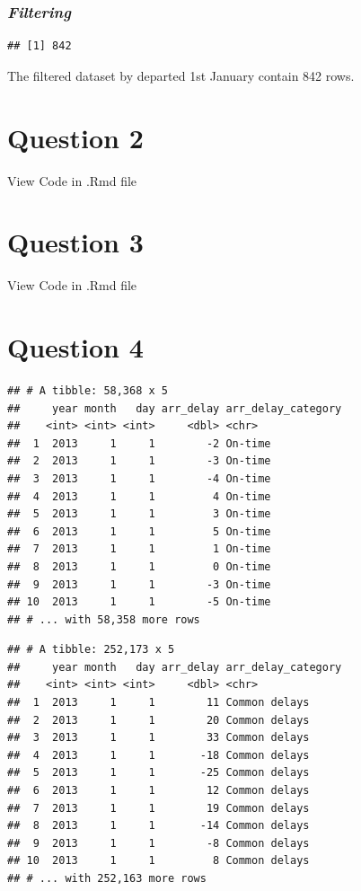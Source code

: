 \documentclass[
]{article}
\begin{document}
\hypertarget{filtering}{%
\subsubsection{\texorpdfstring{\emph{Filtering}}{Filtering}}\label{filtering}}

\begin{verbatim}
## [1] 842
\end{verbatim}

The filtered dataset by departed 1st January contain 842 rows.

\hypertarget{question-2}{%
\section{Question 2}\label{question-2}}

View Code in .Rmd file

\hypertarget{question-3}{%
\section{Question 3}\label{question-3}}

View Code in .Rmd file

\hypertarget{question-4}{%
\section{Question 4}\label{question-4}}

\begin{verbatim}
## # A tibble: 58,368 x 5
##     year month   day arr_delay arr_delay_category
##    <int> <int> <int>     <dbl> <chr>             
##  1  2013     1     1        -2 On-time           
##  2  2013     1     1        -3 On-time           
##  3  2013     1     1        -4 On-time           
##  4  2013     1     1         4 On-time           
##  5  2013     1     1         3 On-time           
##  6  2013     1     1         5 On-time           
##  7  2013     1     1         1 On-time           
##  8  2013     1     1         0 On-time           
##  9  2013     1     1        -3 On-time           
## 10  2013     1     1        -5 On-time           
## # ... with 58,358 more rows
\end{verbatim}

\begin{verbatim}
## # A tibble: 252,173 x 5
##     year month   day arr_delay arr_delay_category
##    <int> <int> <int>     <dbl> <chr>             
##  1  2013     1     1        11 Common delays     
##  2  2013     1     1        20 Common delays     
##  3  2013     1     1        33 Common delays     
##  4  2013     1     1       -18 Common delays     
##  5  2013     1     1       -25 Common delays     
##  6  2013     1     1        12 Common delays     
##  7  2013     1     1        19 Common delays     
##  8  2013     1     1       -14 Common delays     
##  9  2013     1     1        -8 Common delays     
## 10  2013     1     1         8 Common delays     
## # ... with 252,163 more rows
\end{verbatim}
\end{document}
